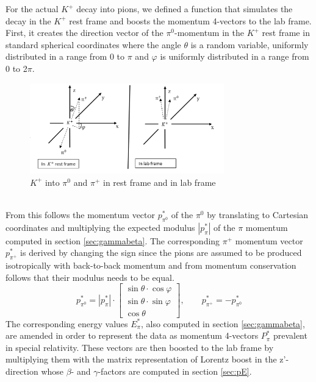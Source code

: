 \documentclass[a4paper,parskip,11pt, DIV12]{scrreprt}
\begin{document}
	For the actual $K^+$ decay into pions, we defined a function that simulates the decay in the $K^+$ rest frame and boosts the momentum 4-vectors to the lab frame.
	First, it creates the direction vector of the $\pi^0$-momentum in the $K^+$ rest frame in standard spherical coordinates where the angle $\theta$ is a random variable, uniformly distributed in a range from 0 to $\pi$ and $\varphi$ is uniformly distributed in a range from 0 to 2$\pi$. 
	\begin{figure}[htbp] 
		\centering
		\includegraphics[width=0.75\textwidth]{Frames.png} 
		\caption{$K^+$ into $\pi^0$ and $\pi^+$ in rest frame and in lab frame}
		\label{fig:2}    
	\end{figure}
\\
From this follows the momentum vector $p^*_{\pi^0}$ of the $\pi^0$ by translating to Cartesian coordinates and multiplying the expected modulus $|p^*_{\pi}|$ of the $\pi$ momentum computed in section \ref{sec:gammabeta}. The corresponding $\pi^+$ momentum vector $p^*_{\pi^+}$ is derived by changing the sign since the pions are assumed to be produced isotropically with back-to-back momentum and from momentum conservation follows that their modulus needs to be equal. 
	\begin{equation}
		p^*_{\pi^0} = |p^*_{\pi}| \cdot \begin{bmatrix}
			\sin\theta \cdot \cos\varphi \\ \sin\theta \cdot \sin\varphi \\ \cos\theta
		\end{bmatrix}
		, \quad \quad p^*_{\pi^+} = -p^*_{\pi^0}
	\end{equation}
	The corresponding energy values $E^*_{\pi}$, also computed in section \ref{sec:gammabeta}, are amended in order to represent the data as momentum 4-vectors $P^*_{\pi}$  prevalent in special relativity. These vectors are then boosted to the lab frame by multiplying them with the matrix representation of Lorentz boost in the z'-direction whose $\beta$- and $\gamma$-factors are computed in section \ref{sec:pE}.
\end{document}
